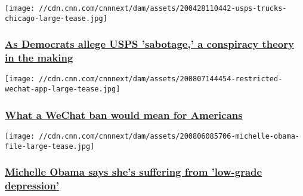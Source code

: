 \href{/2020/08/08/politics/usps-postal-service-democrats-allegations-sabotage/index.html}{}

\texttt{[image: //cdn.cnn.com/cnnnext/dam/assets/200428110442-usps-trucks-chicago-large-tease.jpg]}

\hypertarget{as-democrats-allege-usps-sabotage-a-conspiracy-theory-in-the-making}{%
\subsubsection{\texorpdfstring{\href{/2020/08/08/politics/usps-postal-service-democrats-allegations-sabotage/index.html}{As
Democrats allege USPS 'sabotage,' a conspiracy theory in the
making}}{As Democrats allege USPS 'sabotage,' a conspiracy theory in the making}}\label{as-democrats-allege-usps-sabotage-a-conspiracy-theory-in-the-making}}

\href{/2020/08/08/tech/wechat-chinese-americans-trump/index.html}{}

\texttt{[image: //cdn.cnn.com/cnnnext/dam/assets/200807144454-restricted-wechat-app-large-tease.jpg]}

\hypertarget{what-a-wechat-ban-would-mean-for-americans}{%
\subsubsection{\texorpdfstring{\href{/2020/08/08/tech/wechat-chinese-americans-trump/index.html}{What
a WeChat ban would mean for
Americans}}{What a WeChat ban would mean for Americans}}\label{what-a-wechat-ban-would-mean-for-americans}}

\href{/2020/08/06/us/michelle-obama-coronavirus-depression-trnd/index.html}{}

\texttt{[image: //cdn.cnn.com/cnnnext/dam/assets/200806085706-michelle-obama-file-large-tease.jpg]}

\hypertarget{michelle-obama-says-shes-suffering-from-low-grade-depression}{%
\subsubsection{\texorpdfstring{\href{/2020/08/06/us/michelle-obama-coronavirus-depression-trnd/index.html}{Michelle
Obama says she's suffering from 'low-grade
depression'}}{Michelle Obama says she's suffering from 'low-grade depression'}}\label{michelle-obama-says-shes-suffering-from-low-grade-depression}}

\href{/2020/08/08/politics/larry-hogan-coronavirus-schools-voting-elections/index.html}{}


